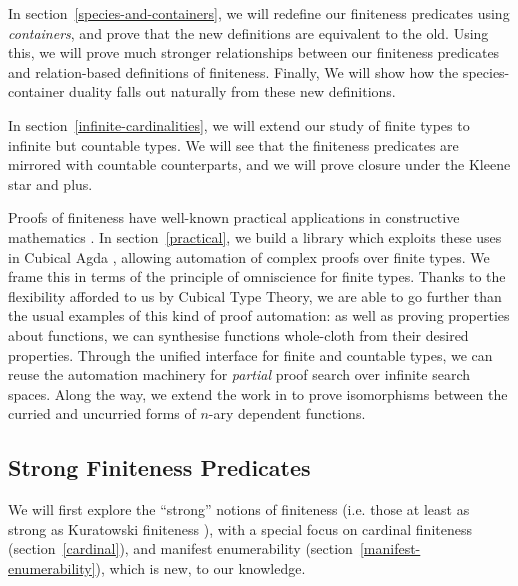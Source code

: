 In section~\ref{species-and-containers}, we will redefine our finiteness
predicates using \emph{containers}, and prove that the new definitions are
equivalent to the old.
Using this, we will prove much stronger relationships between our finiteness
predicates and relation-based definitions of finiteness.
Finally, We will show how the species-container duality falls out naturally from
these new definitions.

In section~\ref{infinite-cardinalities}, we will extend our study of finite
types to infinite but countable types.
We will see that the finiteness predicates are mirrored with countable
counterparts, and we will prove closure under the Kleene star and plus.

Proofs of finiteness have well-known practical applications in
constructive mathematics \cite{firsovDependentlyTypedProgramming2015}.
In section~\ref{practical}, we build a library which exploits these uses in
Cubical Agda \cite{vezzosiCubicalAgdaDependently2019}, allowing automation of
complex proofs over finite types.
We frame this in terms of the principle of omniscience for finite types.
Thanks to the flexibility afforded to us by Cubical Type Theory, we are able to
go further than the usual examples of this kind of proof automation: as well as
proving properties about functions, we can synthesise functions whole-cloth from
their desired properties.
Through the unified interface for finite and countable types, we can
reuse the automation machinery for \emph{partial} proof search over infinite
search spaces.
Along the way, we extend the work in \cite{allaisGenericLevelPolymorphic2019} to
prove isomorphisms between the curried and uncurried forms of \(n\)-ary
dependent functions.








\subsection{Strong Finiteness Predicates}
We will first explore the ``strong'' notions of finiteness (i.e. those at least
as strong as Kuratowski finiteness \cite{kuratowskiNotionEnsembleFini1920}),
with a special focus on cardinal finiteness (section~\ref{cardinal}), and
manifest enumerability (section~\ref{manifest-enumerability}), which is new, to
our knowledge.

